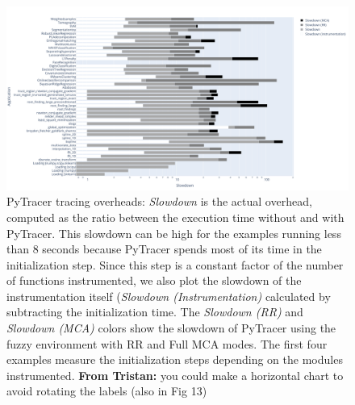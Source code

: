 \documentclass[11pt]{article}
\newcommand{\tristan}[1]{\color{orange}\textbf{From Tristan:} #1\color{black}\xspace}
\newcommand{\pytracer}[0]{PyTracer\xspace}
\begin{document}
\begin{figure}
    \centering
    \includegraphics[width=\linewidth]{figure/performance.pdf}
    \caption{
    \pytracer tracing overheads: \textit{Slowdown} is the actual overhead, computed as the ratio between the execution time without and with \pytracer. This slowdown can be high for the examples running less than 8 seconds because \pytracer spends most of its time in the initialization step. Since this step is a constant factor of the number of functions instrumented, we also plot the slowdown of the instrumentation itself (\textit{Slowdown (Instrumentation)} calculated by subtracting the initialization time.
    The \textit{Slowdown (RR)} and \textit{Slowdown (MCA)} colors show the slowdown of \pytracer 
    using the fuzzy environment with RR and Full MCA modes.
    The first four examples measure the initialization steps depending on the modules instrumented. \tristan{you could make a horizontal chart to avoid rotating the labels (also in Fig 13)}
    }
    \label{fig:performance_tracing}
\end{figure}


\end{document}
